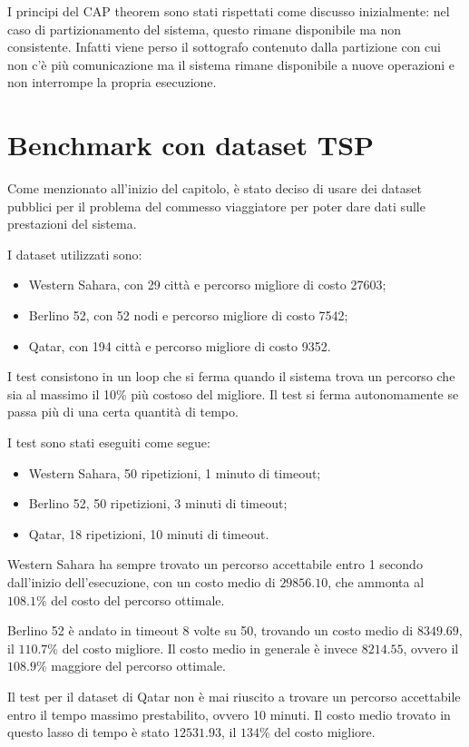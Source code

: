 I principi del CAP theorem sono stati rispettati come discusso inizialmente: nel caso di partizionamento del sistema,
questo rimane disponibile ma non consistente. Infatti viene perso il sottografo contenuto dalla 
partizione con cui non c'è più comunicazione ma il sistema rimane disponibile a nuove operazioni e non
interrompe la propria esecuzione.

\section{Benchmark con dataset TSP}
Come menzionato all'inizio del capitolo, è stato deciso di usare dei dataset pubblici
per il problema del commesso viaggiatore per poter dare dati sulle prestazioni del sistema.

I dataset utilizzati sono:
\begin{itemize}
    \item Western Sahara, con 29 città e percorso migliore di costo 27603;
    \item Berlino 52, con 52 nodi e percorso migliore di costo 7542\cite{ShoTorJal15};
    \item Qatar, con 194 città e percorso migliore di costo 9352.
\end{itemize}

I test consistono in un loop che si ferma quando il sistema trova un percorso
che sia al massimo il 10\% più costoso del migliore. Il test si ferma autonomamente se
passa più di una certa quantità di tempo.

I test sono stati eseguiti come segue:
\begin{itemize}
    \item Western Sahara, 50 ripetizioni, 1 minuto di timeout;
    \item Berlino 52, 50 ripetizioni, 3 minuti di timeout;
    \item Qatar, 18 ripetizioni, 10 minuti di timeout.
\end{itemize}

Western Sahara ha sempre trovato un percorso accettabile entro 1 secondo
dall'inizio dell'esecuzione, con un costo medio di $29856.10$, che ammonta
al $108.1\%$ del costo del percorso ottimale.

Berlino 52 è andato in timeout 8 volte su 50, trovando un costo medio di $8349.69$, il $110.7\%$
del costo migliore. Il costo medio in generale è invece $8214.55$, ovvero il $108.9\%$ maggiore 
del percorso ottimale.

Il test per il dataset di Qatar non è mai riuscito a trovare un percorso accettabile entro
il tempo massimo prestabilito, ovvero 10 minuti.
Il costo medio trovato in questo lasso di tempo è stato $12531.93$, il 
$134\%$ del costo migliore.




